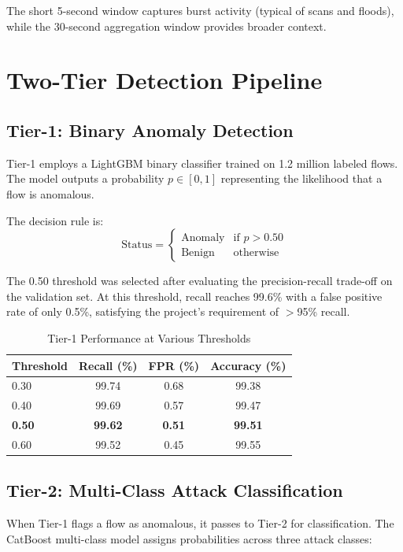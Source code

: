 \documentclass[12pt,a4paper,twoside]{report}
\begin{document}
The short 5-second window captures burst activity (typical of scans and floods), while the 30-second aggregation window provides broader context.

\section{Two-Tier Detection Pipeline}

\subsection{Tier-1: Binary Anomaly Detection}

Tier-1 employs a LightGBM binary classifier trained on 1.2 million labeled flows. The model outputs a probability $p \in [0,1]$ representing the likelihood that a flow is anomalous.

The decision rule is:
\[
\text{Status} = \begin{cases}
\text{Anomaly} & \text{if } p > 0.50 \\
\text{Benign} & \text{otherwise}
\end{cases}
\]

The 0.50 threshold was selected after evaluating the precision-recall trade-off on the validation set. At this threshold, recall reaches 99.6\% with a false positive rate of only 0.5\%, satisfying the project's requirement of $>$95\% recall.

\begin{table}[H]
\centering
\caption{Tier-1 Performance at Various Thresholds}
\begin{tabularx}{\textwidth}{lccc}
\toprule
\textbf{Threshold} & \textbf{Recall (\%)} & \textbf{FPR (\%)} & \textbf{Accuracy (\%)} \\
\midrule
0.30 & 99.74 & 0.68 & 99.38 \\
0.40 & 99.69 & 0.57 & 99.47 \\
\textbf{0.50} & \textbf{99.62} & \textbf{0.51} & \textbf{99.51} \\
0.60 & 99.52 & 0.45 & 99.55 \\
\bottomrule
\end{tabularx}
\end{table}

\subsection{Tier-2: Multi-Class Attack Classification}

When Tier-1 flags a flow as anomalous, it passes to Tier-2 for classification. The CatBoost multi-class model assigns probabilities across three attack classes:
\end{document}
